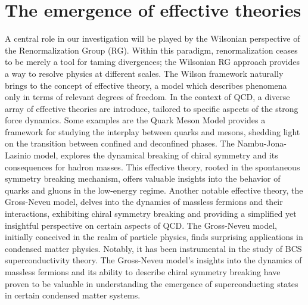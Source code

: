 \section{The emergence of effective theories}
A central role in our investigation will be played by the Wilsonian perspective of the Renormalization Group (RG). Within this paradigm, renormalization ceases to be merely a tool for taming divergences; 
the Wilsonian RG approach provides a way to resolve physics at different scales. The Wilson framework naturally brings to the concept of effective theory, a model which describes phenomena only in terms of relevant degrees of freedom. In the context of QCD, a diverse array of effective theories are introduce, tailored to specific aspects of the strong force dynamics. 
Some examples are the Quark Meson Model provides a framework for studying the interplay between quarks and mesons, shedding light on the transition between confined and deconfined phases.
The Nambu-Jona-Lasinio model, explores the dynamical breaking of chiral symmetry and its consequences for hadron masses. This effective theory, rooted in the spontaneous symmetry breaking mechanism, offers valuable insights into the behavior of quarks and gluons in the low-energy regime.
Another notable effective theory, the Gross-Neveu model, delves into the dynamics of massless fermions and their interactions, exhibiting chiral symmetry breaking and providing a simplified yet insightful perspective on certain aspects of QCD.
The Gross-Neveu model, initially conceived in the realm of particle physics, finds surprising applications in condensed matter physics. Notably, it has been instrumental in the study of BCS superconductivity theory. The Gross-Neveu model's insights into the dynamics of massless fermions and its ability to describe chiral symmetry breaking have proven to be valuable in understanding the emergence of superconducting states in certain condensed matter systems. 
